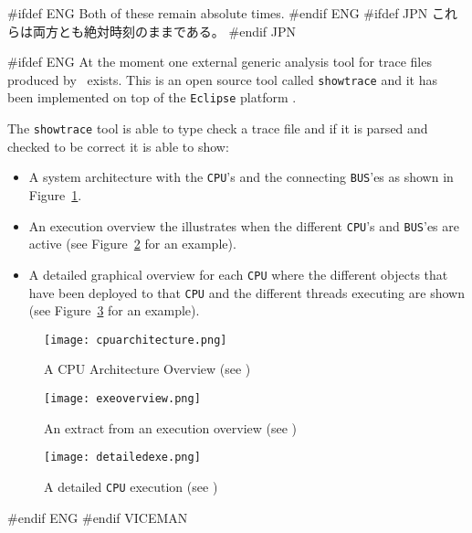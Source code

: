\documentclass[\pformat,12pt]{article}
\begin{document}
#ifdef ENG
Both of these remain absolute times.
#endif ENG
#ifdef JPN
これらは両方とも絶対時刻のままである。
#endif JPN

#ifdef ENG
At the moment one external generic analysis tool for trace files produced by
\VDMTools\ exists. This is an open source tool called \texttt{showtrace} and
it has been implemented on top of the \texttt{Eclipse} platform 
\cite{Carlson05}. 

The \texttt{showtrace} tool is able to type check a trace file and if it 
is parsed and checked to be correct it is able to show:

\begin{itemize}
\item A system architecture with the \texttt{CPU}'s and the connecting
      \texttt{BUS}'es as shown in Figure~\ref{fig:cpuarchitecture}.
\item An execution overview the illustrates when the different 
      \texttt{CPU}'s and \texttt{BUS}'es are active (see 
      Figure~\ref{fig:exeoverview} for an example).
\item A detailed graphical overview for each \texttt{CPU} where the
      different objects that have been deployed to that \texttt{CPU} and
      the different threads executing are shown (see 
      Figure~\ref{fig:detailedexe} for an example).
\end{itemize}

\begin{figure}
\begin{center}
\texttt{[image: cpuarchitecture.png]}
\end{center}
\caption{A CPU Architecture Overview (see \cite{VICEGuide-CSK})
\label{fig:cpuarchitecture}}
\end{figure}

\begin{figure}
\begin{center}
\texttt{[image: exeoverview.png]}
\end{center}
\caption{An extract from an execution overview (see \cite{VICEGuide-CSK})}
\label{fig:exeoverview}
\end{figure}

\begin{figure}
\begin{center}
\texttt{[image: detailedexe.png]}
\end{center}
\caption{A detailed \texttt{CPU} execution (see \cite{VICEGuide-CSK})}
\label{fig:detailedexe}
\end{figure}
#endif ENG
#endif VICEMAN
\end{document}

